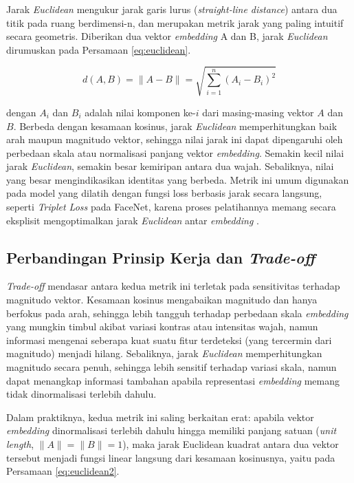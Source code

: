 Jarak \textit{Euclidean} mengukur jarak garis lurus (\textit{straight-line distance}) antara dua titik pada ruang berdimensi-n, dan merupakan metrik jarak yang paling intuitif secara geometris. Diberikan dua vektor \textit{embedding} A dan B, jarak \textit{Euclidean} dirumuskan pada Persamaan \ref{eq:euclidean}.

\begin{equation}
d(A, B) = \|A - B\| = \sqrt{\sum_{i=1}^{n} (A_i - B_i)^2}
\label{eq:euclidean}
\end{equation}

dengan $A_i$ dan $B_i$ adalah nilai komponen ke-$i$ dari masing-masing vektor $A$ dan $B$. Berbeda dengan kesamaan kosinus, jarak \textit{Euclidean} memperhitungkan baik arah maupun magnitudo vektor, sehingga nilai jarak ini dapat dipengaruhi oleh perbedaan skala atau normalisasi panjang vektor \textit{embedding}. Semakin kecil nilai jarak \textit{Euclidean}, semakin besar kemiripan antara dua wajah. Sebaliknya, nilai yang besar mengindikasikan identitas yang berbeda. Metrik ini umum digunakan pada model yang dilatih dengan fungsi loss berbasis jarak secara langsung, seperti \textit{Triplet Loss} pada FaceNet, karena proses pelatihannya memang secara eksplisit mengoptimalkan jarak \textit{Euclidean} antar \textit{embedding} \autocite{schroff2015facenet}.

\subsection{Perbandingan Prinsip Kerja dan \textit{Trade-off}}

\textit{Trade-off} mendasar antara kedua metrik ini terletak pada sensitivitas terhadap magnitudo vektor. Kesamaan kosinus mengabaikan magnitudo dan hanya berfokus pada arah, sehingga lebih tangguh terhadap perbedaan skala \textit{embedding} yang mungkin timbul akibat variasi kontras atau intensitas wajah, namun informasi mengenai seberapa kuat suatu fitur terdeteksi (yang tercermin dari magnitudo) menjadi hilang. Sebaliknya, jarak \textit{Euclidean} memperhitungkan magnitudo secara penuh, sehingga lebih sensitif terhadap variasi skala, namun dapat menangkap informasi tambahan apabila representasi \textit{embedding} memang tidak dinormalisasi terlebih dahulu.

Dalam praktiknya, kedua metrik ini saling berkaitan erat: apabila vektor \textit{embedding} dinormalisasi terlebih dahulu hingga memiliki panjang satuan (\textit{unit length}, $\|A\| = \|B\| = 1$), maka jarak Euclidean kuadrat antara dua vektor tersebut menjadi fungsi linear langsung dari kesamaan kosinusnya, yaitu pada Persamaan \ref{eq:euclidean2}.

